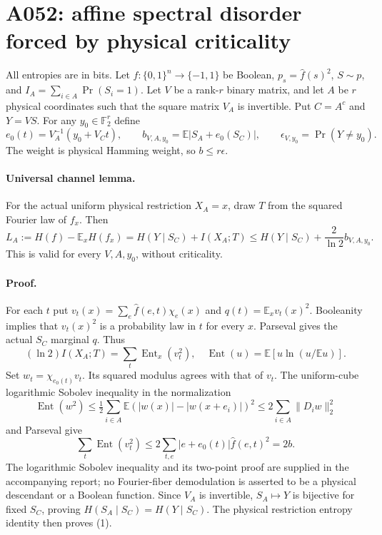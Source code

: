 \documentclass{article}
\begin{document}
\section*{A052: affine spectral disorder forced by physical criticality}
All entropies are in bits. Let $f:\{0,1\}^n\to\{-1,1\}$ be Boolean,
$p_s=\widehat f(s)^2$, $S\sim p$, and $I_A=\sum_{i\in A}\Pr(S_i=1)$.
Let $V$ be a rank-$r$ binary matrix, and let $A$ be $r$ physical coordinates
such that the square matrix $V_A$ is invertible. Put $C=A^c$ and $Y=VS$.
For any $y_0\in\mathbb F_2^r$ define
\[
 e_0(t)=V_A^{-1}(y_0+V_Ct),\qquad
 b_{V,A,y_0}=\mathbb E|S_A+e_0(S_C)|,\qquad
 \epsilon_{V,y_0}=\Pr(Y\ne y_0).
\]
The weight is physical Hamming weight, so $b\le r\epsilon$.

\paragraph{Universal channel lemma.}
For the actual uniform physical restriction $X_A=x$, draw $T$ from the
squared Fourier law of $f_x$. Then
\[
 L_A:=H(f)-\mathbb E_xH(f_x)
 =H(Y\mid S_C)+I(X_A;T)
 \le H(Y\mid S_C)+\frac{2}{\ln2}b_{V,A,y_0}.\tag{1}
\]
This is valid for every $V,A,y_0$, without criticality.

\paragraph{Proof.}
For each $t$ put $v_t(x)=\sum_e\widehat f(e,t)\chi_e(x)$ and
$q(t)=\mathbb E_xv_t(x)^2$. Booleanity implies that $v_t(x)^2$ is a
probability law in $t$ for every $x$. Parseval gives the actual $S_C$
marginal $q$. Thus
\[
 (\ln2)I(X_A;T)=\sum_t\operatorname{Ent}_x(v_t^2),
 \quad \operatorname{Ent}(u)=\mathbb E[u\ln(u/\mathbb Eu)].
\]
Set $w_t=\chi_{e_0(t)}v_t$. Its squared modulus agrees with that of $v_t$.
The uniform-cube logarithmic Sobolev inequality in the normalization
\[
 \operatorname{Ent}(w^2)\le\tfrac12\sum_{i\in A}
 \mathbb E(|w(x)|-|w(x+e_i)|)^2
 \le2\sum_{i\in A}\|D_iw\|_2^2
\]
and Parseval give
\[
 \sum_t\operatorname{Ent}(v_t^2)
 \le2\sum_{t,e}|e+e_0(t)|\widehat f(e,t)^2=2b.
\]
The logarithmic Sobolev inequality and its two-point proof are supplied in
the accompanying report; no Fourier-fiber demodulation is asserted to be
a physical descendant or a Boolean function. Since $V_A$ is invertible,
$S_A\mapsto Y$ is bijective for fixed $S_C$, proving
$H(S_A\mid S_C)=H(Y\mid S_C)$. The physical restriction entropy identity
then proves (1).
\end{document}
